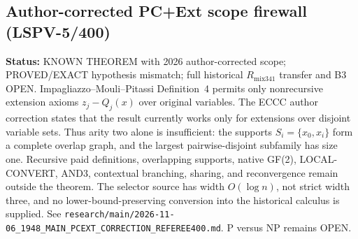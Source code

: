 \subsection{Author-corrected PC+Ext scope firewall (LSPV-5/400)}
\textbf{Status:} KNOWN THEOREM with 2026 author-corrected scope;
PROVED/EXACT hypothesis mismatch; full historical \(R_{\mathrm{mix341}}\)
transfer and B3 OPEN.  Impagliazzo--Mouli--Pitassi Definition~4 permits
only nonrecursive extension axioms \(z_j-Q_j(x)\) over original variables.
The ECCC author correction states that the result currently works only for
extensions over disjoint variable sets.  Thus arity two alone is insufficient:
the supports \(S_i=\{x_0,x_i\}\) form a complete overlap graph, and the
largest pairwise-disjoint subfamily has size one.  Recursive paid definitions,
overlapping supports, native GF(2), LOCAL-CONVERT, AND3, contextual branching,
sharing, and reconvergence remain outside the theorem.  The selector source has
width \(O(\log n)\), not strict width three, and no lower-bound-preserving
conversion into the historical calculus is supplied.  See
\texttt{research/main/2026-11-06\_1948\_MAIN\_PCEXT\_CORRECTION\_REFEREE400.md}.
P versus NP remains OPEN.
